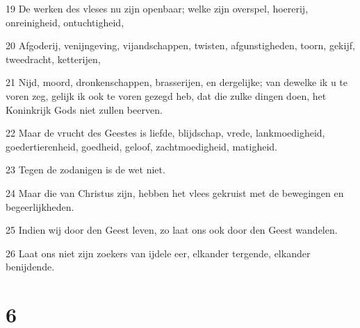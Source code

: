 \par 19 De werken des vleses nu zijn openbaar; welke zijn overspel, hoererij, onreinigheid, ontuchtigheid,
\par 20 Afgoderij, venijngeving, vijandschappen, twisten, afgunstigheden, toorn, gekijf, tweedracht, ketterijen,
\par 21 Nijd, moord, dronkenschappen, brasserijen, en dergelijke; van dewelke ik u te voren zeg, gelijk ik ook te voren gezegd heb, dat die zulke dingen doen, het Koninkrijk Gods niet zullen beerven.
\par 22 Maar de vrucht des Geestes is liefde, blijdschap, vrede, lankmoedigheid, goedertierenheid, goedheid, geloof, zachtmoedigheid, matigheid.
\par 23 Tegen de zodanigen is de wet niet.
\par 24 Maar die van Christus zijn, hebben het vlees gekruist met de bewegingen en begeerlijkheden.
\par 25 Indien wij door den Geest leven, zo laat ons ook door den Geest wandelen.
\par 26 Laat ons niet zijn zoekers van ijdele eer, elkander tergende, elkander benijdende.

\chapter{6}

